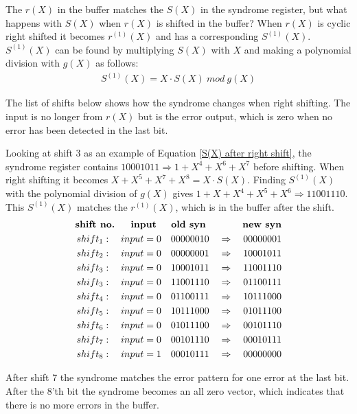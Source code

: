 \documentclass[Main]{subfiles}
\begin{document}
The $r(X)$ in the buffer matches the $S(X)$ in the syndrome register, but what happens with $S(X)$ when $r(X)$ is shifted in the buffer?
When $r(X)$ is cyclic right shifted it becomes $r^{(1)}(X)$ and has a corresponding $S^{(1)}(X)$.
$S^{(1)}(X)$ can be found by multiplying $S(X)$ with $X$ and making a polynomial division with $g(X)$ as follows:
\begin{eqnarray}
\label{S(X) after right shift}
S^{(1)}(X) = X \cdot S(X) \: mod \: g(X)
\end{eqnarray}
 
The list of shifts below shows how the syndrome changes when right shifting.
The input is no longer from $r(X)$ but is the error output, which is zero when no error has been detected in the last bit. 

Looking at shift 3 as an example of Equation \ref{S(X) after right shift}, the syndrome register contains $10001011 \Rightarrow 1+X^4+X^6+X^7$ before shifting.
When right shifting it becomes $X+X^5+X^7+X^8 = X \cdot S(X)$.
Finding $S^{(1)}(X)$ with the polynomial division of $g(X)$ gives $1+X+X^4+X^5+X^6 \Rightarrow 11001110$.
This $S^{(1)}(X)$ matches the $r^{(1)}(X)$, which is in the buffer after the shift.
\begin{eqnarray*}
\textbf{shift no. \quad	input \quad old syn \qquad \quad new syn}\\
shift_1: \quad input = 0 \quad 00000010 \quad \Rightarrow \quad 00000001\\
shift_2: \quad input = 0 \quad 00000001 \quad \Rightarrow \quad 10001011\\
shift_3: \quad input = 0 \quad 10001011 \quad \Rightarrow \quad 11001110\\
shift_3: \quad input = 0 \quad 11001110 \quad \Rightarrow \quad 01100111\\
shift_4: \quad input = 0 \quad 01100111 \quad \Rightarrow \quad 10111000\\
shift_5: \quad input = 0 \quad 10111000 \quad \Rightarrow \quad 01011100\\
shift_6: \quad input = 0 \quad 01011100 \quad \Rightarrow \quad 00101110\\
shift_7: \quad input = 0 \quad 00101110 \quad \Rightarrow \quad 00010111\\
shift_8: \quad input = 1 \quad 00010111 \quad \Rightarrow \quad 00000000
\end{eqnarray*}

After shift 7 the syndrome matches the error pattern for one error at the last bit.
After the 8'th bit the syndrome becomes an all zero vector, which indicates that there is no more errors in the buffer.
\end{document}
